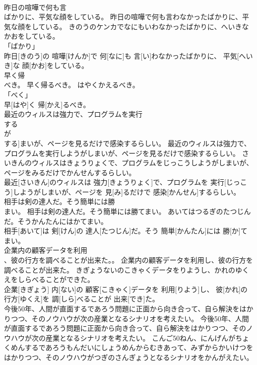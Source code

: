 \documentclass[8pt]{extreport}
\begin{document}
\begin{CJK}{UTF8}{min}
\\	昨日の喧嘩で何も言
\\	ばかりに、平気な顔をしている。	昨日の喧嘩で何も言わなかったばかりに、平気な顔をしている。	きのうのケンカでなにもいわなかったばかりに、へいきなかおをしている。	
\\	「ばかり」 
\\	昨日[きのう]の 喧嘩[けんか]で 何[なに]も 言[い]わなかったばかりに、 平気[へいき]な 顔[かお]をしている。		
\\	早く帰
\\	べき。	早く帰るべき。	はやくかえるべき。	
\\	「べく」 
\\	早[はや]く 帰[かえ]るべき。		
\\	最近のウィルスは強力で、プログラムを実行
\\	する 
\\	が
\\	する]まいが、ページを見るだけで感染するらしい。	最近のウィルスは強力で、プログラムを実行しようがしまいが、ページを見るだけで感染するらしい。	さいきんのウィルスはきょうりょくで、プログラムをじっこうしようがしまいが、ページをみるだけでかんせんするらしい。	
\\	最近[さいきん]のウィルスは 強力[きょうりょく]で、プログラムを 実行[じっこう]しようがしまいが、ページを 見[み]るだけで 感染[かんせん]するらしい。		
\\	相手は剣の達人だ。そう簡単には勝
\\	まい。	相手は剣の達人だ。そう簡単には勝てまい。	あいてはつるぎのたつじんだ。そうかんたんにはかてまい。	
\\	相手[あいて]は 剣[けん]の 達人[たつじん]だ。そう 簡単[かんたん]には 勝[か]てまい。		
\\	企業内の顧客データを利用
\\	、彼の行方を調べることが出来た。。	企業内の顧客データを利用し、彼の行方を調べることが出来た。	きぎょうないのこきゃくデータをりようし、かれのゆくえをしらべることができた。	
\\	企業[きぎょう] 内[ない]の 顧客[こきゃく]データを 利用[りよう]し、 彼[かれ]の 行方[ゆくえ]を 調[しら]べることが 出来[でき]た。		
\\	今後50年、人間が直面するであろう問題に正面から向き合って、自ら解決をはかりつつ、そのノウハウが次の産業となるシナリオを考えたい。	今後50年、人間が直面するであろう問題に正面から向き合って、自ら解決をはかりつつ、そのノウハウが次の産業となるシナリオを考えたい。	こんご50ねん、にんげんがちょくめんするであろうもんだいにしょうめんからむきあって、みずからかいけつをはかりつつ、そのノウハウがつぎのさんぎょうとなるシナリオをかんがえたい。	

\end{CJK}
\end{document}

